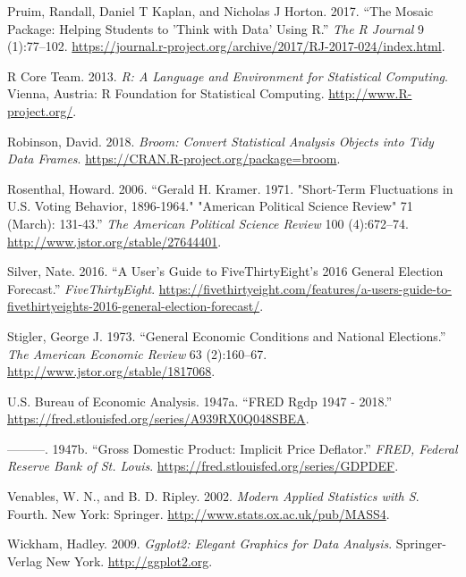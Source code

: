 \documentclass[11,]{article}
\begin{document}
\leavevmode\hypertarget{ref-mosaic}{}%
Pruim, Randall, Daniel T Kaplan, and Nicholas J Horton. 2017. ``The
Mosaic Package: Helping Students to 'Think with Data' Using R.''
\emph{The R Journal} 9 (1):77--102.
\url{https://journal.r-project.org/archive/2017/RJ-2017-024/index.html}.

\leavevmode\hypertarget{ref-R}{}%
R Core Team. 2013. \emph{R: A Language and Environment for Statistical
Computing}. Vienna, Austria: R Foundation for Statistical Computing.
\url{http://www.R-project.org/}.

\leavevmode\hypertarget{ref-broom}{}%
Robinson, David. 2018. \emph{Broom: Convert Statistical Analysis Objects
into Tidy Data Frames}. \url{https://CRAN.R-project.org/package=broom}.

\leavevmode\hypertarget{ref-rosenthal_gerald_2006}{}%
Rosenthal, Howard. 2006. ``Gerald H. Kramer. 1971. "Short-Term
Fluctuations in U.S. Voting Behavior, 1896-1964." "American Political
Science Review" 71 (March): 131-43.'' \emph{The American Political
Science Review} 100 (4):672--74.
\url{http://www.jstor.org/stable/27644401}.

\leavevmode\hypertarget{ref-silver_users_2016}{}%
Silver, Nate. 2016. ``A User's Guide to FiveThirtyEight's 2016 General
Election Forecast.'' \emph{FiveThirtyEight}.
\url{https://fivethirtyeight.com/features/a-users-guide-to-fivethirtyeights-2016-general-election-forecast/}.

\leavevmode\hypertarget{ref-stigler_general_1973}{}%
Stigler, George J. 1973. ``General Economic Conditions and National
Elections.'' \emph{The American Economic Review} 63 (2):160--67.
\url{http://www.jstor.org/stable/1817068}.

\leavevmode\hypertarget{ref-FRED_1947}{}%
U.S. Bureau of Economic Analysis. 1947a. ``FRED Rgdp 1947 - 2018.''
\url{https://fred.stlouisfed.org/series/A939RX0Q048SBEA}.

\leavevmode\hypertarget{ref-us_bureau_of_economic_analysis_gross_1947}{}%
---------. 1947b. ``Gross Domestic Product: Implicit Price Deflator.''
\emph{FRED, Federal Reserve Bank of St. Louis}.
\url{https://fred.stlouisfed.org/series/GDPDEF}.

\leavevmode\hypertarget{ref-MASS}{}%
Venables, W. N., and B. D. Ripley. 2002. \emph{Modern Applied Statistics
with S}. Fourth. New York: Springer.
\url{http://www.stats.ox.ac.uk/pub/MASS4}.

\leavevmode\hypertarget{ref-ggplot2}{}%
Wickham, Hadley. 2009. \emph{Ggplot2: Elegant Graphics for Data
Analysis}. Springer-Verlag New York. \url{http://ggplot2.org}.
\end{document}
